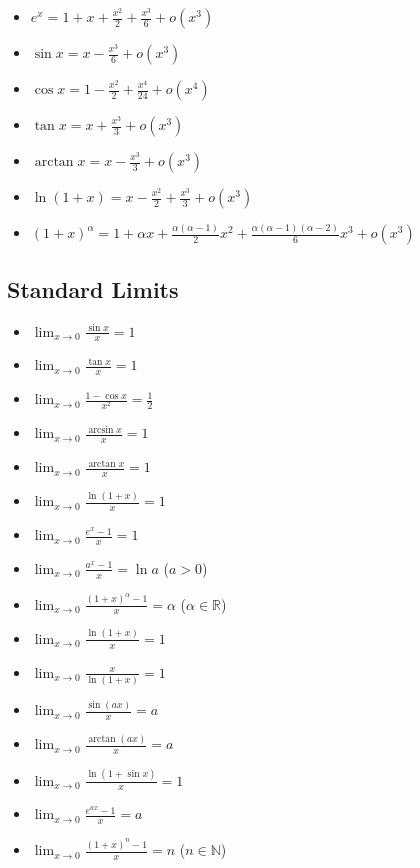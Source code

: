 \begin{cascade}
	\begin{itemize}
		\item $e^x = 1 + x + \frac{x^2}{2} + \frac{x^3}{6} + o(x^3)$
		\item $\sin x = x - \frac{x^3}{6} + o(x^3)$
		\item $\cos x = 1 - \frac{x^2}{2} + \frac{x^4}{24} + o(x^4)$
		\item $\tan x = x + \frac{x^3}{3} + o(x^3)$
		\item $\arctan x = x - \frac{x^3}{3} + o(x^3)$
		\item $\ln(1+x) = x - \frac{x^2}{2} + \frac{x^3}{3} + o(x^3)$
		\item $(1+x)^\alpha = 1 + \alpha x + \frac{\alpha(\alpha-1)}{2}x^2 + \frac{\alpha(\alpha-1)(\alpha-2)}{6}x^3 + o(x^3)$
	\end{itemize}
\end{cascade}

\subsection{Standard Limits}

\begin{cascade}
	\begin{itemize}
		\item $\displaystyle \lim_{x \to 0} \frac{\sin x}{x} = 1$
		\item $\displaystyle \lim_{x \to 0} \frac{\tan x}{x} = 1$
		\item $\displaystyle \lim_{x \to 0} \frac{1 - \cos x}{x^2} = \frac{1}{2}$
		\item $\displaystyle \lim_{x \to 0} \frac{\arcsin x}{x} = 1$
		\item $\displaystyle \lim_{x \to 0} \frac{\arctan x}{x} = 1$
		\item $\displaystyle \lim_{x \to 0} \frac{\ln(1+x)}{x} = 1$
		\item $\displaystyle \lim_{x \to 0} \frac{e^x - 1}{x} = 1$
		\item $\displaystyle \lim_{x \to 0} \frac{a^x - 1}{x} = \ln a$ ($a>0$)
		\item $\displaystyle \lim_{x \to 0} \frac{(1+x)^\alpha - 1}{x} = \alpha$ ($\alpha \in \mathbb{R}$)
		\item $\displaystyle \lim_{x \to 0} \frac{\ln(1+x)}{x} = 1$
		\item $\displaystyle \lim_{x \to 0} \frac{x}{\ln(1+x)} = 1$
		\item $\displaystyle \lim_{x \to 0} \frac{\sin(ax)}{x} = a$
		\item $\displaystyle \lim_{x \to 0} \frac{\arctan(ax)}{x} = a$
		\item $\displaystyle \lim_{x \to 0} \frac{\ln(1+\sin x)}{x} = 1$
		\item $\displaystyle \lim_{x \to 0} \frac{e^{ax} - 1}{x} = a$
		\item $\displaystyle \lim_{x \to 0} \frac{(1+x)^n - 1}{x} = n$ ($n \in \mathbb{N}$)
	\end{itemize}
\end{cascade}

